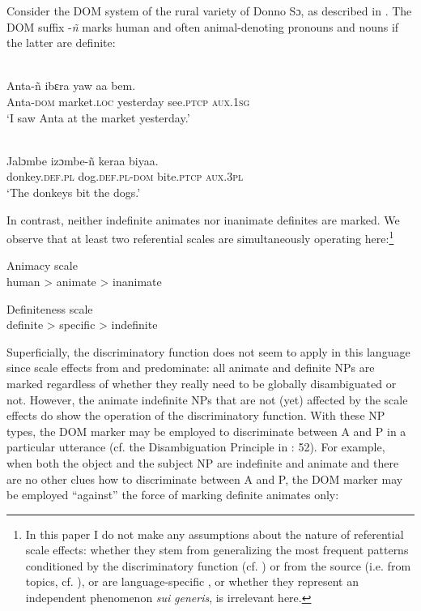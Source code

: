 \documentclass[output=paper]{langsci/langscibook}
\begin{document}
Consider the DOM system of the rural variety of Donno Sɔ, as described in \citet{Culy1995}. The DOM suffix \nobreakdash-\textit{ñ} marks human and often animal-denoting pronouns and nouns if the latter are definite:

\ea\label{ex:serzant:4}
\\
\gll   Anta-ñ     ibɛra     yaw     aa      bem.\\
     Anta-\textsc{dom}  market.\textsc{loc}  yesterday  see.\textsc{ptcp} \textsc{aux.1sg}\\
\glt ‘I saw Anta at the market yesterday.’
\z

\ea\label{ex:serzant:}
\\
\gll  Jalɔmbe   izɔmbe-ñ     keraa     biyaa.\\
     donkey.\textsc{def.pl} dog.\textsc{def.pl-dom}   bite.\textsc{ptcp}   \textsc{aux.3pl}\\
\glt ‘The donkeys bit the dogs.’
\z

In contrast, neither indefinite animates nor inanimate definites are marked. We observe that at least two referential scales are simultaneously operating here:\footnote{In this paper I do not make any assumptions about the nature of referential scale effects: whether they stem from generalizing the most frequent patterns conditioned by the discriminatory function (cf. \citealt{Aissen2003}) or from the source (i.e. from topics, cf. \citealt{DalrympleNikolaeva2011}), or are language-specific \citep{BickelEtAl2015}, or whether they represent an independent phenomenon \textit{sui} \textit{generis}, is irrelevant here.}

\ea\label{ex:serzant:6}
Animacy scale\\
human > animate > inanimate
\z

\ea\label{ex:serzant:7}
Definiteness scale\\
definite > specific > indefinite
\z

Superficially, the discriminatory function does not seem to apply in this language since scale effects from  and  predominate: all animate and definite NPs are marked regardless of whether they really need to be globally disambiguated or not. However, the animate indefinite NPs that are not (yet) affected by the scale effects do show the operation of the discriminatory function. With these NP types, the DOM marker may be employed to discriminate between A and P in a particular utterance (cf. the Disambiguation Principle in \citealt{Culy1995}: 52). For example, when both the object and the subject NP are indefinite and animate and there are no other clues how to discriminate between A and P, the DOM marker may be employed “against” the force of marking definite animates only:
\end{document}
